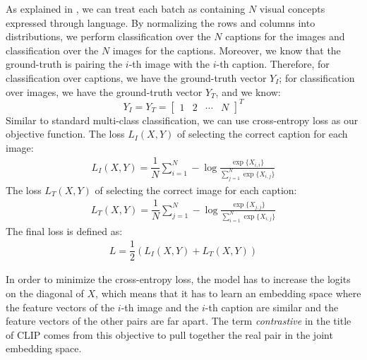 As explained in \cite{CLIPpaper}, we can treat each batch as containing $N$ visual concepts expressed through language.
By normalizing the rows and columns into distributions, we perform classification over the $N$ captions for the images and classification over the $N$ images for the captions.  
Moreover, we know that the ground-truth is pairing the $i$-th image with the $i$-th caption.   
Therefore, for classification over captions, we have the ground-truth vector $Y_I$; for classification over images, we have the ground-truth vector $Y_T$, and we know: 
$$Y_I = Y_T = \begin{bmatrix}1 & 2 & \cdots & N \end{bmatrix}^T $$ 
Similar to standard multi-class classification, we can use cross-entropy loss as our objective function. The loss $L_I(X, Y)$ of selecting the correct caption for each image:
\begin{equation} \label{cliploss.image}
\begin{split}
    L_I(X, Y) = \dfrac{1}{N} \sum_{i=1}^N -\log\frac{\exp\{ {X}_{i,i} \}}{ \sum_{j=1}^N \exp\{ {X}_{i,j} \} }
\end{split}
\end{equation}
The loss $L_T(X, Y)$ of selecting the correct image for each caption:
\begin{equation} \label{cliploss.text}
\begin{split}
    L_T(X, Y) = \dfrac{1}{N} \sum_{j=1}^N -\log\frac{\exp\{ {X}_{j,j} \}}{ \sum_{i=1}^N \exp\{ {X}_{i,j} \} }
\end{split}
\end{equation}
The final loss is defined as:
\begin{equation} \label{cliploss.all}
\begin{split}
    L = \dfrac{1}{2} (L_I(X, Y) + L_T(X, Y))
\end{split}
\end{equation}

In order to minimize the cross-entropy loss, the model has to increase the logits on the diagonal of $X$, which means that it has to learn an embedding space where the feature vectors of the $i$-th image and the $i$-th caption are similar and the feature vectors of the other pairs are far apart. The term \textit{contrastive} in the title of CLIP comes from this objective to pull together the real pair in the joint embedding space.    


